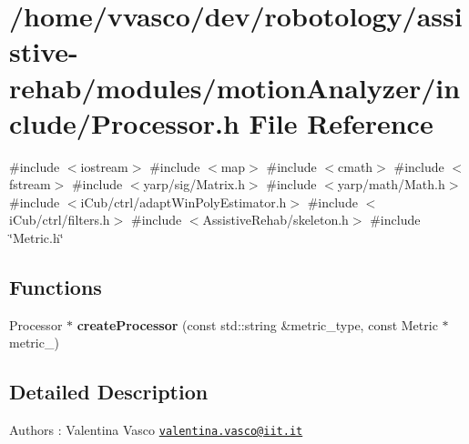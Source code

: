 \section{/home/vvasco/dev/robotology/assistive-\/rehab/modules/motion\+Analyzer/include/\+Processor.h File Reference}
\label{Processor_8h}
{\ttfamily \#include $<$iostream$>$}\newline
{\ttfamily \#include $<$map$>$}\newline
{\ttfamily \#include $<$cmath$>$}\newline
{\ttfamily \#include $<$fstream$>$}\newline
{\ttfamily \#include $<$yarp/sig/\+Matrix.\+h$>$}\newline
{\ttfamily \#include $<$yarp/math/\+Math.\+h$>$}\newline
{\ttfamily \#include $<$i\+Cub/ctrl/adapt\+Win\+Poly\+Estimator.\+h$>$}\newline
{\ttfamily \#include $<$i\+Cub/ctrl/filters.\+h$>$}\newline
{\ttfamily \#include $<$Assistive\+Rehab/skeleton.\+h$>$}\newline
{\ttfamily \#include \char`\"{}Metric.\+h\char`\"{}}\newline
\subsection*{Functions}
\begin{DoxyCompactItemize}
\item 
\mbox{\label{Processor_8h_a0ae4c67160d19584fcd102d4616a5bee}} 
Processor $\ast$ {\bfseries create\+Processor} (const std\+::string \&metric\+\_\+type, const Metric $\ast$metric\+\_\+)
\end{DoxyCompactItemize}


\subsection{Detailed Description}
\begin{DoxyAuthor}{Authors}
\+: Valentina Vasco \href{mailto:valentina.vasco@iit.it}{\tt valentina.\+vasco@iit.\+it} 
\end{DoxyAuthor}
